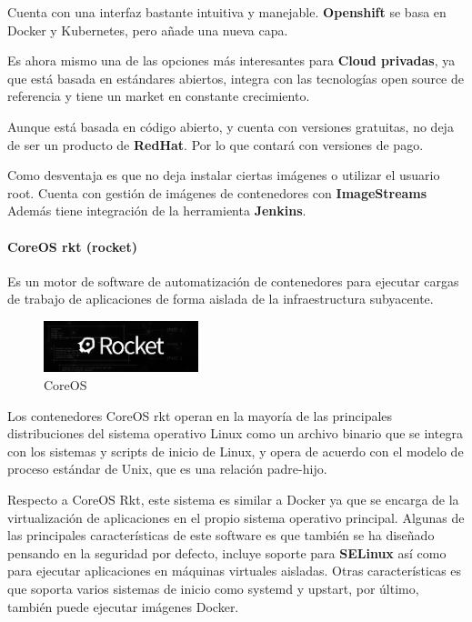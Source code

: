 Cuenta con una interfaz bastante intuitiva y manejable. \textbf{Openshift} se basa en Docker y Kubernetes, pero añade una nueva capa.

Es ahora mismo una de las opciones más interesantes para \textbf{Cloud privadas}, ya que está basada en estándares abiertos, integra con las tecnologías open source de referencia y tiene un market en constante crecimiento. 

Aunque está basada en código abierto, y cuenta con versiones gratuitas, no deja de ser un producto de \textbf{RedHat}. Por lo que contará con versiones de pago. 

Como desventaja es que no deja instalar ciertas imágenes o utilizar el usuario root. Cuenta con gestión de imágenes de contenedores con \textbf{ImageStreams} Además tiene integración de la herramienta \textbf{Jenkins}.

\paragraph{CoreOS rkt (rocket)}
Es un  motor de software de automatización de contenedores para ejecutar cargas de trabajo de aplicaciones de forma aislada de la infraestructura subyacente.\cite{rkt}

\begin{figure}[H]
	\centering
	\includegraphics[width=0.4\textwidth]{imagenes/entorno/rocket.png}
	\caption{CoreOS} \label{rocket}
\end{figure}

Los contenedores CoreOS rkt operan en la mayoría de las principales distribuciones del sistema operativo Linux como un archivo binario que se integra con los sistemas y scripts de inicio de Linux, y opera de acuerdo con el modelo de proceso estándar de Unix, que es una relación padre-hijo. 

Respecto a CoreOS Rkt, este sistema es similar a Docker ya que se encarga de la virtualización de aplicaciones en el propio sistema operativo principal.
\newpage
Algunas de las principales características de este software es que también se ha diseñado pensando en la seguridad por defecto, incluye soporte para \textbf{SELinux} así como para ejecutar aplicaciones en máquinas virtuales aisladas. Otras características es que soporta varios sistemas de inicio como systemd y upstart, por último, también puede ejecutar imágenes Docker.

